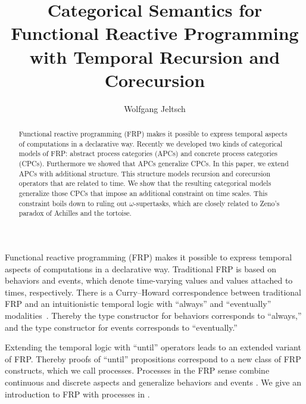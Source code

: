 \documentclass[copyright,creativecommons]{eptcs}
\title{Categorical Semantics for Functional Reactive Programming\\
       with Temporal Recursion and Corecursion}
\author{Wolfgang Jeltsch
        \institute{TTÜ Küberneetika Instituut\\Tallinn, Estonia}
        \email{wolfgang@cs.ioc.ee}}
\begin{document}
\maketitle

\begin{abstract}

Functional reactive programming (FRP) makes it possible to express temporal
aspects of computations in a declarative way. Recently we developed two kinds of
categorical models of FRP: abstract process categories (APCs) and concrete
process categories (CPCs). Furthermore we showed that APCs generalize CPCs. In
this paper, we extend APCs with additional structure. This structure models
recursion and corecursion operators that are related to time. We show that the
resulting categorical models generalize those CPCs that impose an additional
constraint on time scales. This constraint boils down to ruling out
$ω$-supertasks, which are closely related to Zeno’s paradox of Achilles and the
tortoise.

\end{abstract}




Functional reactive programming (FRP) makes it possible to express temporal
aspects of computations in a declarative way. Traditional FRP is based on
behaviors and events, which denote time-varying values and values attached to
times, respectively. There is a Curry–Howard correspondence between traditional
FRP and an intuitionistic temporal logic with “always” and “eventually”
modalities~\cite{jeltsch:entcs-286,jeffrey:plpv-2012}. Thereby the type
constructor for behaviors corresponds to “always,” and the type constructor for
events corresponds to “eventually.”

Extending the temporal logic with “until” operators leads to an extended variant
of FRP. Thereby proofs of “until” propositions correspond to a new class of FRP
constructs, which we call processes. Processes in the FRP sense combine
continuous and discrete aspects and generalize behaviors and events
\cite[Section~2]{jeltsch:plpv-2013}. We give an introduction to FRP with
processes in .
\end{document}
